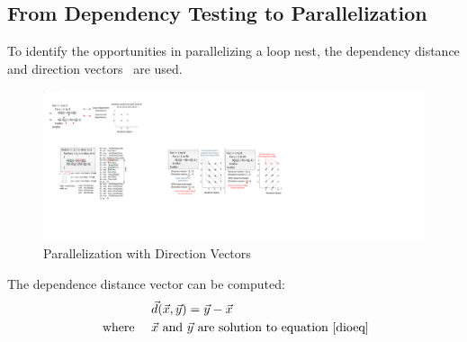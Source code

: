 








\subsection{From Dependency Testing to Parallelization}
\label{sec:fdtp}

To identify the opportunities in parallelizing a loop nest, the dependency distance and direction vectors~\cite{opac-b1000180} are used.

\begin{figure}[htp]
\begin{center}
\includegraphics[width=1.0\linewidth]{chap6fig/paral.pdf}
\caption{Parallelization with Direction Vectors
\label{fig:paral}}
\end{center}
\end{figure}
The dependence distance vector can be computed:
\begin{equation*}
\begin{aligned}
&  & & \vec{d}(\vec{x},\vec{y}) = \vec{y}-\vec{x} \\
& \text{ where }&   & \vec{x} \text{ and }\vec{y} \text{ are solution to equation~\ref{dioeq}}  
\end{aligned}
\end{equation*}

